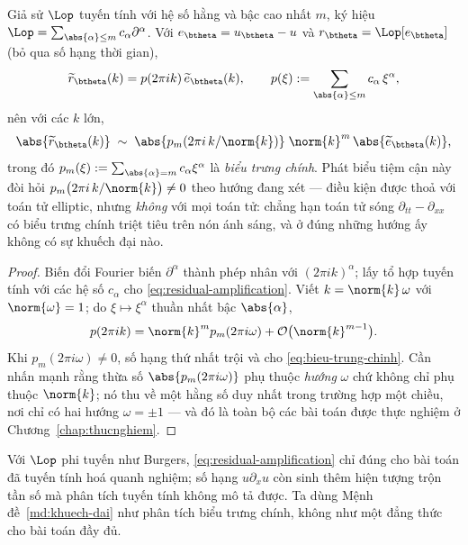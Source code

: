 \begin{menhde}
\label{md:khuech-dai}
Giả sử $\Lop$ tuyến tính với hệ số hằng và bậc cao nhất $m$, ký hiệu
$\Lop = \sum_{\abs{\alpha}\le m} c_\alpha \partial^{\alpha}$. Với
$e_{\btheta} = u_{\btheta} - u$ và $r_{\btheta} = \Lop[e_{\btheta}]$ (bỏ qua số
hạng thời gian),
\begin{equation}
\widetilde{r}_{\btheta}(k)
 = p(2\pi i k)\, \widetilde{e}_{\btheta}(k),
\qquad
p(\xi) := \sum_{\abs{\alpha}\le m} c_\alpha\, \xi^{\alpha},
\label{eq:residual-amplification}
\end{equation}
nên với các $k$ lớn,
\begin{equation}
\abs{\widetilde{r}_{\btheta}(k)}
 \;\sim\; \abs{p_m\!\left(2\pi i\,k/\norm{k}\right)}\;
   \norm{k}^{m}\,\abs{\widetilde{e}_{\btheta}(k)},
\label{eq:bieu-trung-chinh}
\end{equation}
trong đó $p_m(\xi) := \sum_{\abs{\alpha}=m} c_\alpha \xi^{\alpha}$ là
\emph{biểu trưng chính}. Phát biểu tiệm cận này đòi hỏi
$p_m\big(2\pi i\,k/\norm{k}\big) \ne 0$ theo hướng đang xét --- điều kiện được
thoả với toán tử elliptic, nhưng \emph{không} với mọi toán tử: chẳng hạn toán tử
sóng $\partial_{tt} - \partial_{xx}$ có biểu trưng chính triệt tiêu trên nón ánh
sáng, và ở đúng những hướng ấy không có sự khuếch đại nào.
\end{menhde}
 
\begin{proof}
Biến đổi Fourier biến $\partial^{\alpha}$ thành phép nhân với
$(2\pi i k)^{\alpha}$; lấy tổ hợp tuyến tính với các hệ số $c_\alpha$ cho
\eqref{eq:residual-amplification}. Viết $k = \norm{k}\,\omega$ với
$\norm{\omega} = 1$; do $\xi \mapsto \xi^{\alpha}$ thuần nhất bậc
$\abs{\alpha}$,
\[
p(2\pi i k) = \norm{k}^{m} p_m(2\pi i \omega)
 + \mathcal{O}\big(\norm{k}^{m-1}\big).
\]
Khi $p_m(2\pi i\omega) \ne 0$, số hạng thứ nhất trội và cho
\eqref{eq:bieu-trung-chinh}. Cần nhấn mạnh rằng thừa số
$\abs{p_m(2\pi i\omega)}$ phụ thuộc \emph{hướng} $\omega$ chứ không chỉ phụ
thuộc $\norm{k}$; nó thu về một hằng số duy nhất trong trường hợp một chiều, nơi
chỉ có hai hướng $\omega = \pm 1$ --- và đó là toàn bộ các bài toán được thực
nghiệm ở Chương~\ref{chap:thucnghiem}.
\end{proof}
 
Với $\Lop$ phi tuyến như Burgers, \eqref{eq:residual-amplification} chỉ đúng cho
bài toán đã tuyến tính hoá quanh nghiệm; số hạng $u\partial_x u$ còn sinh thêm
hiện tượng trộn tần số mà phân tích tuyến tính không mô tả được. Ta dùng
Mệnh đề~\ref{md:khuech-dai} như phân tích biểu trưng chính, không như một đẳng thức
cho bài toán đầy đủ.
 
